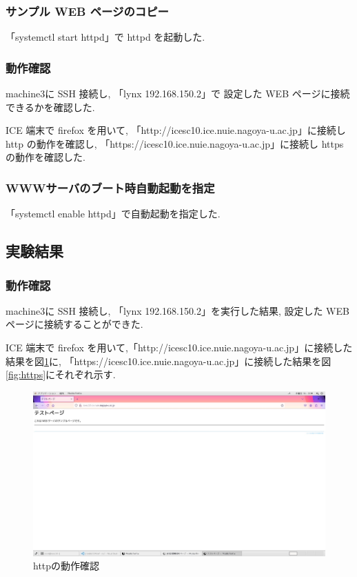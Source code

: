 \documentclass{ltjsarticle} %
\begin{document}
\subsubsection{サンプル WEB ページのコピー}
「systemctl start httpd」で httpd を起動した. 

\subsubsection{動作確認}
machine3に SSH 接続し, 「lynx 192.168.150.2」で 設定した WEB ページに接続できるかを確認した. 

ICE 端末で firefox を用いて, 「http://icesc10.ice.nuie.nagoya-u.ac.jp」に接続し http の動作を確認し, 
「https://icesc10.ice.nuie.nagoya-u.ac.jp」に接続し https の動作を確認した. 

\subsubsection{WWWサーバのブート時自動起動を指定}
「systemctl enable httpd」で自動起動を指定した. 


\subsection{実験結果}

\subsubsection{動作確認}
machine3に SSH 接続し, 「lynx 192.168.150.2」を実行した結果, 設定した WEB ページに接続することができた. 

ICE 端末で firefox を用いて,「http://icesc10.ice.nuie.nagoya-u.ac.jp」に接続した結果を図\ref{fig:http}に, 
「https://icesc10.ice.nuie.nagoya-u.ac.jp」に接続した結果を図\ref{fig:https}にそれぞれ示す. 

\begin{figure}[H] %
  \centering
  \includegraphics[width=1.0\textwidth]{http.JPEG} %
  \caption{httpの動作確認} %
  \label{fig:http} %
\end{figure}
\end{document}
